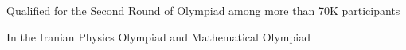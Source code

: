 \documentclass[letterpaper,MMMyyyy,nonstopmode]{simpleresumecv}
\begin{document}
\begin{Body}
\Gap
\BulletItem
Qualified for the Second Round of Olympiad
among more than 70K participants
\hfill
\textsl{\small{}}
\begin{Detail}
\Item
In the Iranian Physics Olympiad and Mathematical Olympiad
\end{Detail}










\begin{multicols}{2}
\begin{itemize}[leftmargin=*]


\end{itemize}
\end{multicols}
\end{Body}
\end{document}
